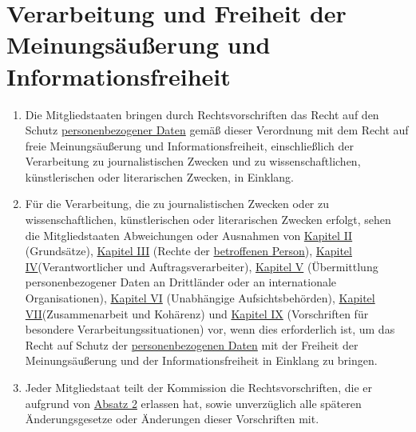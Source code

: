 \chapter{Verarbeitung und Freiheit der Meinungsäußerung und Informationsfreiheit}
\label{ch:85}


\begin{enumerate}

  \item Die Mitgliedstaaten bringen durch Rechtsvorschriften das Recht auf den Schutz \hyperref[itm:04-1]{personenbezogener Daten} gemäß
   dieser Verordnung mit dem Recht auf freie Meinungsäußerung und Informationsfreiheit, einschließlich der Verarbeitung
   zu journalistischen Zwecken und zu wissenschaftlichen, künstlerischen oder literarischen Zwecken, in Einklang.
  \label{itm:85-1}

  \item Für die Verarbeitung, die zu journalistischen Zwecken oder zu wissenschaftlichen, künstlerischen oder
   literarischen Zwecken erfolgt, sehen die Mitgliedstaaten Abweichungen oder Ausnahmen von \hyperref[part:2]
   {Kapitel II} (Grundsätze), \hyperref[part:3]{Kapitel III} (Rechte der \hyperref[itm:04-1]{betroffenen Person}), \hyperref[part:4]
   {Kapitel IV}(Verantwortlicher und Auftragsverarbeiter), \hyperref[part:5]{Kapitel V} (Übermittlung personenbezogener
   Daten an Drittländer oder an internationale Organisationen), \hyperref[part:6]{Kapitel VI}
   (Unabhängige Aufsichtsbehörden), \hyperref[part:7]{Kapitel VII}(Zusammenarbeit und Kohärenz) und \hyperref[part:9]
   {Kapitel IX} (Vorschriften für besondere Verarbeitungssituationen) vor, wenn dies erforderlich ist, um das Recht auf
   Schutz der \hyperref[itm:04-1]{personenbezogenen Daten} mit der Freiheit der Meinungsäußerung und der Informationsfreiheit in Einklang zu
   bringen.
  \label{itm:85-2}

  \item Jeder Mitgliedstaat teilt der Kommission die Rechtsvorschriften, die er aufgrund von \hyperref[itm:85-2]
   {Absatz 2} erlassen hat, sowie unverzüglich alle späteren Änderungsgesetze oder Änderungen dieser Vorschriften mit.
  \label{itm:85-3}

\end{enumerate}


